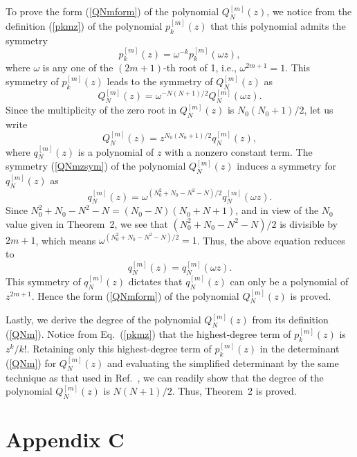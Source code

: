 \documentclass[amsmath,amssymb]{revtex4}
\def\[{\begin{equation}}
\def\]{\end{equation}}
\begin{document}
To prove the form (\ref{QNmform}) of the polynomial $Q_{N}^{[m]}(z)$, we notice from the definition (\ref{pkmz}) of the polynomial $p_{k}^{[m]}(z)$ that this polynomial admits the symmetry
\[
p_{k}^{[m]}(z)=\omega^{-k}p_{k}^{[m]}(\omega z),
\]
where $\omega$ is any one of the $(2m+1)$-th root of 1, i.e., $\omega^{2m+1}=1$. This symmetry of $p_{k}^{[m]}(z)$ leads to the symmetry of $Q_{N}^{[m]}(z)$ as
\[ \label{QNmzsym}
Q_{N}^{[m]}(z)=\omega^{-N(N+1)/2} Q_{N}^{[m]}(\omega z).
\]
Since the multiplicity of the zero root in $Q_{N}^{[m]}(z)$ is $N_{0}(N_{0}+1)/2$, let us write
\[
Q_{N}^{[m]}(z)=z^{N_0(N_0+1)/2}q_{N}^{[m]}(z),
\]
where $q_{N}^{[m]}(z)$ is a polynomial of $z$ with a nonzero constant term. The symmetry (\ref{QNmzsym}) of the polynomial $Q_{N}^{[m]}(z)$ induces a symmetry for $q_{N}^{[m]}(z)$ as
\[
q_{N}^{[m]}(z)=\omega^{(N_0^2+N_0-N^2-N)/2}q_{N}^{[m]}(\omega z).
\]
Since $N_0^2+N_0-N^2-N=(N_0-N)(N_0+N+1)$, and in view of the $N_0$ value given in Theorem~2, we see that $(N_0^2+N_0-N^2-N)/2$ is divisible by $2m+1$, which means $\omega^{(N_0^2+N_0-N^2-N)/2}=1$. Thus, the above equation reduces to
\[
q_{N}^{[m]}(z)=q_{N}^{[m]}(\omega z).
\]
This symmetry of $q_{N}^{[m]}(z)$ dictates that $q_{N}^{[m]}(z)$ can only be a polynomial of $z^{2m+1}$. Hence the form (\ref{QNmform}) of the polynomial $Q_{N}^{[m]}(z)$ is proved.

Lastly, we derive the degree of the polynomial $Q_{N}^{[m]}(z)$ from its definition (\ref{QNm}). Notice from Eq.~(\ref{pkmz}) that the highest-degree term of $p^{[m]}_{k}(z)$ is $z^k/k!$. Retaining only this highest-degree term of $p^{[m]}_{k}(z)$ in the determinant (\ref{QNm}) for $Q_{N}^{[m]}(z)$ and evaluating the simplified determinant by the same technique as that used in Ref.~\cite{OhtaJY2012}, we can readily show that the degree of the polynomial $Q_{N}^{[m]}(z)$ is $N(N+1)/2$. Thus, Theorem~2 is proved.


\section*{Appendix C}
\end{document}
